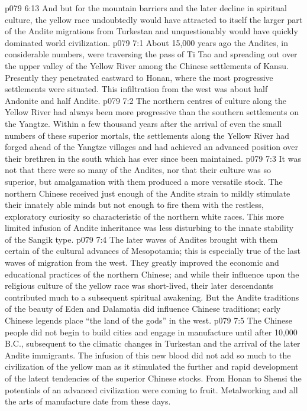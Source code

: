 \vs p079 6:13 And but for the mountain barriers and the later decline in spiritual culture, the yellow race undoubtedly would have attracted to itself the larger part of the Andite migrations from Turkestan and unquestionably would have quickly dominated world civilization.
\vs p079 7:1 About 15,000 years ago the Andites, in considerable numbers, were traversing the pass of Ti Tao and spreading out over the upper valley of the Yellow River among the Chinese settlements of Kansu. Presently they penetrated eastward to Honan, where the most progressive settlements were situated. This infiltration from the west was about half Andonite and half Andite.
\vs p079 7:2 The northern centres of culture along the Yellow River had always been more progressive than the southern settlements on the Yangtze. Within a few thousand years after the arrival of even the small numbers of these superior mortals, the settlements along the Yellow River had forged ahead of the Yangtze villages and had achieved an advanced position over their brethren in the south which has ever since been maintained.
\vs p079 7:3 \pc It was not that there were so many of the Andites, nor that their culture was so superior, but amalgamation with them produced a more versatile stock. The northern Chinese received just enough of the Andite strain to mildly stimulate their innately able minds but not enough to fire them with the restless, exploratory curiosity so characteristic of the northern white races. This more limited infusion of Andite inheritance was less disturbing to the innate stability of the Sangik type.
\vs p079 7:4 \pc The later waves of Andites brought with them certain of the cultural advances of Mesopotamia; this is especially true of the last waves of migration from the west. They greatly improved the economic and educational practices of the northern Chinese; and while their influence upon the religious culture of the yellow race was short\hyp{}lived, their later descendants contributed much to a subsequent spiritual awakening. But the Andite traditions of the beauty of Eden and Dalamatia did influence Chinese traditions; early Chinese legends place “the land of the gods” in the west.
\vs p079 7:5 The Chinese people did not begin to build cities and engage in manufacture until after 10,000\,B.C., subsequent to the climatic changes in Turkestan and the arrival of the later Andite immigrants. The infusion of this new blood did not add so much to the civilization of the yellow man as it stimulated the further and rapid development of the latent tendencies of the superior Chinese stocks. From Honan to Shensi the potentials of an advanced civilization were coming to fruit. Metalworking and all the arts of manufacture date from these days.
